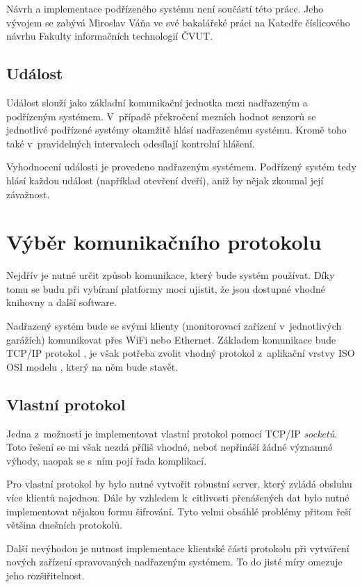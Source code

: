 Návrh a implementace podřízeného systému není součástí této práce. Jeho vývojem se zabývá Miroslav Váňa ve své bakalářské práci na Katedře číslicového návrhu Fakulty informačních technologií ČVUT.

\subsection{Událost}

Událost slouží jako základní komunikační jednotka mezi nadřazeným a podřízeným systémem. V~případě překročení mezních hodnot senzorů se jednotlivé podřízené systémy okamžitě hlásí nadřazenému systému. Kromě toho také v~pravidelných intervalech odesílají kontrolní hlášení. 

Vyhodnocení události je provedeno nadřazeným systémem. Podřízený systém tedy hlásí každou událost (například otevření dveří), aniž by nějak zkoumal její závažnost.

\section{Výběr komunikačního protokolu}
\label{sec:an_protocol}

Nejdřív je nutné určit způsob komunikace, který bude systém používat. Díky tomu se budu při vybíraní platformy moci ujistit, že jsou dostupné vhodné knihovny a další software. 

Nadřazený systém bude se svými klienty (monitorovací zařízení v~jednotlivých garážích) komunikovat přes WiFi nebo Ethernet. Základem komunikace bude TCP/IP protokol \cite{tcp}, je však potřeba zvolit vhodný protokol z~aplikační vrstvy ISO OSI modelu \cite{tcp}, který na něm bude stavět.

\subsection{Vlastní protokol}

Jedna z~možností je implementovat vlastní protokol pomocí TCP/IP \textit{socketů}. Toto řešení se mi však nezdá příliš vhodné, neboť nepřináší žádné významné výhody, naopak se s~ním pojí řada komplikací.

Pro vlastní protokol by bylo nutné vytvořit robustní server, který zvládá obsluhu více klientů najednou. Dále by vzhledem k~citlivosti přenášených dat bylo nutné implementovat nějakou formu šifrování. Tyto velmi obsáhlé problémy přitom řeší většina dnešních protokolů.

Další nevýhodou je nutnost implementace klientské části protokolu při vytváření nových zařízení spravovaných nadřazeným systémem. To do jisté míry omezuje jeho rozšiřitelnost.

